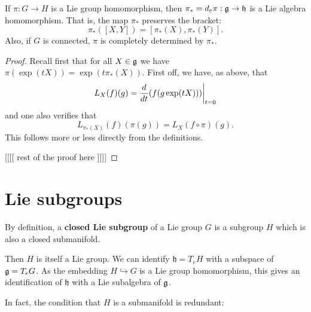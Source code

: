 \documentclass[11pt, english]{article}
\begin{document}
\begin{thm}
If $\pi:G \to H$ is a Lie group homomorphism, then $\pi_\ast= d_e \pi: \mathfrak g \to \mathfrak h$ is a Lie algebra homomorphism. That is, the map $\pi_\ast$ preserves the bracket:
$$
\pi_\ast([X,Y]) = [\pi_\ast(X), \pi_\ast(Y)].
$$
Also, if $G$ is connected, $\pi$ is completely determined by $\pi_\ast$.
\end{thm}
\begin{proof}
Recall first that for all $X \in \mathfrak g$ we have $\pi(\exp(t X)) = \exp(t \pi_\ast (X))$. First off, we have, as above, that
$$
L_X(f)(g) = \restr{ \frac{d}{dt} (f(g \exp(tX)))}{t=0}
$$
and one also verifies that
$$
L_{\pi_\ast(X)} (f) (\pi(g)) = L_X(f \circ \pi)(g).
$$
This follows more or less directly from the definitions. 

[[[[ rest of the proof here ]]]]
\end{proof}



\newpage
\section{Lie subgroups}

By definition, a \textbf{closed Lie subgroup} of a Lie group $G$ is a subgroup $H$ which is also a closed submanifold. 

Then $H$ is itself a Lie group. We can identify $\mathfrak h = T_e H$ with a subspace of $\mathfrak g = T_eG$. As the embedding $H \hookrightarrow G$ is a Lie group homomorphism, this gives an identification of $\mathfrak h$ with a Lie subalgebra of $\mathfrak g$. 

In fact, the condition that $H$ is a submanifold is redundant:
\end{document}
